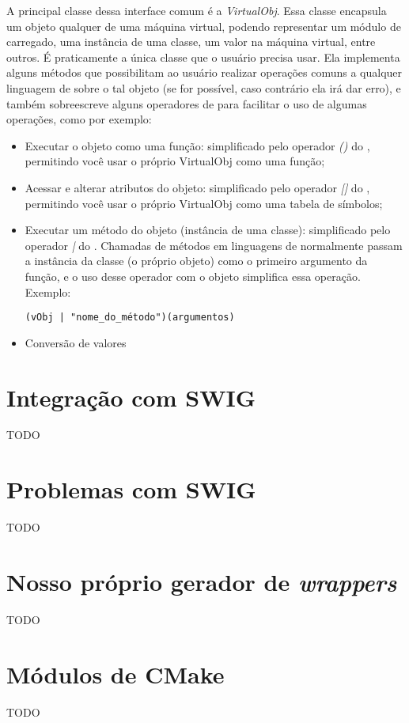   A principal classe dessa interface comum é a \emph{VirtualObj}. Essa classe 
  encapsula um objeto qualquer de uma máquina virtual, podendo representar um
  módulo de \script{} carregado, uma instância de uma classe, um valor na máquina
  virtual, entre outros. É praticamente a única classe que o usuário precisa 
  usar. Ela implementa alguns métodos que possibilitam ao usuário realizar 
  operações comuns a qualquer linguagem de \script{} sobre o tal objeto (se for
  possível, caso contrário ela irá dar erro), e também sobreescreve alguns operadores
  de \CXX{} para facilitar o uso de algumas operações, como por exemplo:
  \begin{itemize}
     \item Executar o objeto como uma função: simplificado pelo operador \emph{()}
       do \CXX{}, permitindo você usar o próprio VirtualObj como uma função;
     \item Acessar e alterar atributos do objeto: simplificado pelo operador
       \emph{[]} do \CXX{}, permitindo você usar o próprio VirtualObj como uma
       tabela de símbolos;
     \item Executar um método do objeto (instância de uma classe): simplificado pelo
       operador \emph{|} do \CXX{}. Chamadas de métodos em linguagens de \script{} normalmente
       passam a instância da classe (o próprio objeto) como o primeiro argumento da
       função, e o uso desse operador com o objeto simplifica essa operação. Exemplo: 
       \begin{verbatim}(vObj | "nome_do_método")(argumentos)\end{verbatim}
     \item Conversão de valores 
     
  \end{itemize} 
  
  \section{Integração com SWIG}
  
  TODO
  
  \section{Problemas com SWIG}
  
  TODO
  
  \section{Nosso próprio gerador de \emph{wrappers}}
  
  TODO
  
  \section{Módulos de CMake}
  
  TODO
